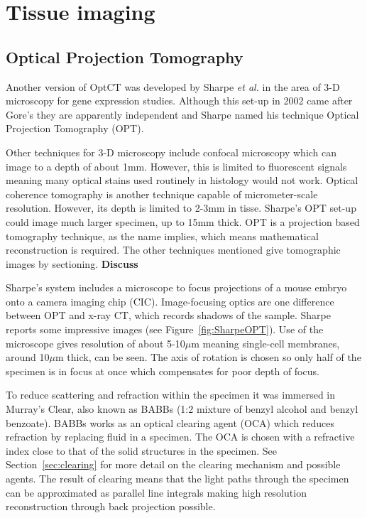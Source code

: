 \documentclass[12pt]{article}
\begin{document}
\newpage
\section{Tissue imaging}
\subsection{Optical Projection Tomography}

Another version of OptCT was  developed by Sharpe \textit{et al.} in the area of 3-D microscopy for gene expression studies. \cite{Sharpe:2002jp} Although this set-up in 2002 came after Gore's they are apparently independent and Sharpe named his technique Optical Projection Tomography (OPT).

Other techniques for 3-D microscopy include confocal microscopy which can image to a depth of about 1mm. \cite{Webb:1996} However, this is limited to fluorescent signals meaning many optical stains used routinely in histology would not work. Optical coherence tomography is another technique capable of micrometer-scale resolution. \cite{huang1993optical} However, its depth is limited to 2-3mm in tisse. Sharpe's OPT set-up could image much larger specimen, up to 15mm thick.  \cite{Sharpe:2002jp} OPT is a projection based tomography technique, as the name implies, which means mathematical reconstruction is required. The other techniques mentioned give tomographic images by sectioning. \cite{Sharpe:2003cm} \textbf{Discuss}

Sharpe's system includes a microscope to focus projections of a mouse embryo onto a camera imaging chip (CIC). Image-focusing optics are one difference between OPT and x-ray CT, which records shadows of the sample. Sharpe reports some impressive images (see Figure~\ref{fig:SharpeOPT}). Use of the microscope gives resolution of about 5-10$\mu$m meaning single-cell membranes, around 10$\mu$m thick, can be seen.\cite{Sharpe:2002jp} The axis of rotation is chosen so only half of the specimen is in focus at once which compensates for poor depth of focus. 

To reduce scattering and refraction within the specimen it was immersed in Murray's Clear, also known as BABBs (1:2 mixture of benzyl alcohol and benzyl benzoate). BABBs works as an optical clearing agent (OCA) which reduces refraction by replacing fluid in a specimen. The OCA is chosen with a refractive index close to that of the solid structures in the specimen. See Section~\ref{sec:clearing} for more detail on the clearing mechanism and possible agents. 
The result of clearing means that the light paths through the specimen can be approximated as parallel line integrals  making high resolution reconstruction through back projection possible.
\end{document}
